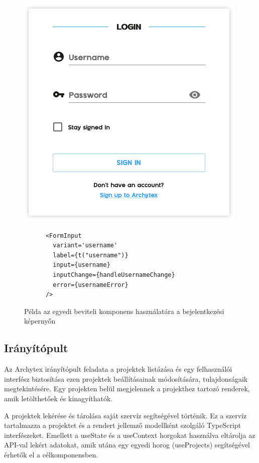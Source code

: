 \begin{figure}[h]
  \centering
  \begin{minipage}{.5\textwidth}
    \centering
    \includegraphics[width=.6\linewidth]{parts/developer-documentation/frontend/images/login.png}
    \label{fig:loginPage}
  \end{minipage}%
  \begin{minipage}{.5\textwidth}
    \centering
    \begin{lstlisting}
      <FormInput
        variant='username'
        label={t("username")}
        input={username}
        inputChange={handleUsernameChange}
        error={usernameError}
      />\end{lstlisting}
  \end{minipage}
  \caption{Példa az egyedi beviteli komponens használatára a bejelentkezési képernyőn}
\end{figure}

\pagebreak

\subsection{Irányítópult}
Az Archytex irányítópult feladata a projektek listázása és egy felhasználói interfész biztosítása ezen projektek beállításainak módosítására, tulajdonságaik megtekintésére. Egy projekten belül megjelennek a projekthez tartozó renderek, amik letölthetőek és kinagyíthatók.

A projektek lekérése és tárolása saját szervíz segítségével történik. Ez a szervíz tartalmazza a projektet és a rendert jellemző modellként szolgáló TypeScript interfészeket. Emellett a useState és a useContext horgokat használva eltárolja az API-val lekért adatokat, amik utána egy egyedi horog (useProjects) segítségével érhetők el a célkomponensben.

